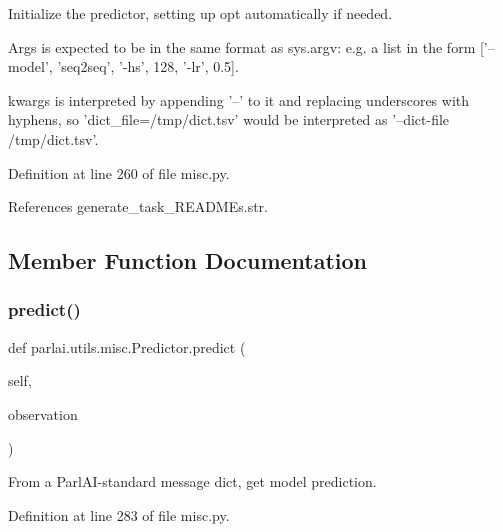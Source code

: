 \begin{DoxyVerb}Initialize the predictor, setting up opt automatically if needed.

Args is expected to be in the same format as sys.argv: e.g. a list in
the form ['--model', 'seq2seq', '-hs', 128, '-lr', 0.5].

kwargs is interpreted by appending '--' to it and replacing underscores
with hyphens, so 'dict_file=/tmp/dict.tsv' would be interpreted as
'--dict-file /tmp/dict.tsv'.
\end{DoxyVerb}
 

Definition at line 260 of file misc.\+py.



References generate\+\_\+task\+\_\+\+R\+E\+A\+D\+M\+Es.\+str.



\subsection{Member Function Documentation}
\mbox{\label{classparlai_1_1utils_1_1misc_1_1Predictor_a7ff8a927bca43d09d3113dad20cb2a11}} 
\subsubsection{\texorpdfstring{predict()}{predict()}}
{\footnotesize\ttfamily def parlai.\+utils.\+misc.\+Predictor.\+predict (\begin{DoxyParamCaption}\item[{}]{self,  }\item[{}]{observation }\end{DoxyParamCaption})}

\begin{DoxyVerb}From a ParlAI-standard message dict, get model prediction.\end{DoxyVerb}
 

Definition at line 283 of file misc.\+py.



